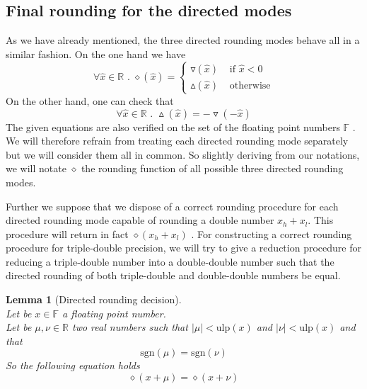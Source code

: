 \documentclass[a4paper,10pt,twoside]{article}
\newtheorem{lemma}[theorem]{Lemma}
\newcommand{\F}{\ensuremath{\mathbb {F}}}
\newcommand{\R}{\ensuremath{\mathbb {R}}}
\newcommand{\hi}{\ensuremath{\mathit{h}}}
\newcommand{\lo}{\ensuremath{\mathit{l}}}
\newcommand{\mUlp}{\ensuremath{\mathrm{ulp}}}
\newcommand{\sgn}{\ensuremath{\mathrm{sgn}}}
\begin{document}
\subsection{Final rounding for the directed modes}
As we have already mentioned, the three directed rounding modes behave all in a similar fashion. On the one hand
we have
$$\forall \hat{x} \in \R \mbox{ . } \diamond \left( \hat{x} \right) = \left \lbrace
\begin{array}{ll}
\triangledown \left( \hat{x} \right) & \mbox{ if } \hat{x} < 0 \\
\vartriangle \left( \hat{x} \right) & \mbox{ otherwise}
\end{array} \right. $$
On the other hand, one can check that
$$\forall \hat{x} \in \R \mbox{ . } \vartriangle \left( \hat{x} \right) = - \triangledown \left( - \hat{x} \right)$$
The given equations are also verified on the set of the floating point numbers $\F$ \cite{Defour-thesis, IEEE754}.
We will therefore refrain from treating each directed rounding mode separately but we will consider them all in
common. So slightly deriving from our notations, we will notate $\diamond$ the rounding function of all possible three
directed rounding modes.\par
Further we suppose that we dispose of a correct rounding procedure for each directed rounding mode capable
of rounding a double number $x_\hi + x_\lo$. This procedure will return in fact $\diamond \left( x_\hi + x_\lo \right)$
\cite{crlibmweb, Defour-thesis}.
For constructing a correct rounding procedure for triple-double precision, we will try to give a reduction
procedure for reducing a triple-double number into a double-double number such that the directed
rounding of both triple-double and double-double numbers be equal.
\begin{lemma}[Directed rounding decision] \label{decarrdir} ~ \\
Let be $x \in \F$ a floating point number. \\
Let be $\mu, \nu \in \R$ two real numbers such that $\left \vert \mu \right \vert < \mUlp\left( x \right)$ and
$\left \vert \nu \right \vert < \mUlp\left( x \right)$  and that
$$\sgn\left( \mu \right) = \sgn\left( \nu \right)$$
So the following equation holds
$$\diamond \left( x + \mu \right) = \diamond\left( x + \nu \right)$$
\end{lemma}
\end{document}
